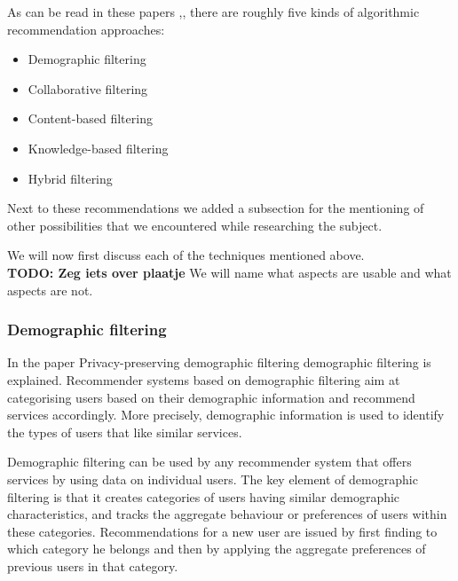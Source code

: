 \documentclass[]{article}
\newcommand{\TODO}[1]{{\color{red}\textbf{TODO: #1}}}
\begin{document}
As can be read in these papers \citep{Breese1998},\citep{Peter2007}, there are roughly five kinds of algorithmic recommendation approaches:

\begin{itemize}
\item Demographic filtering \citep{Peter2007}
\item Collaborative filtering \citep{Peter2007}\citep{Breese1998}
\item Content-based filtering \citep{Peter2007}
\item Knowledge-based filtering \citep{Peter2007}\cite{burke2000knowledge}
\item Hybrid filtering \citep{Peter2007}
\end{itemize}

Next to these recommendations we added a subsection for the mentioning of other possibilities that we encountered while researching the subject.

We will now first discuss each of the techniques mentioned above.\\
\TODO{Zeg iets over plaatje}
We will name what aspects are usable and what aspects are not.

\subsubsection{Demographic filtering}
In the paper Privacy-preserving demographic filtering\cite{aimeur2006privacy} demographic filtering is explained.
Recommender systems based on demographic filtering aim at categorising users based on their demographic information and recommend services accordingly. 
More precisely, demographic information is used to identify the types of users that like similar services. 

Demographic filtering can be used by any recommender system that offers services by using data on individual users. 
The key element of demographic filtering is that it creates categories of users having similar demographic characteristics, and tracks the aggregate behaviour or preferences of users within these categories. 
Recommendations for a new user are issued by first finding to which category he belongs and then by applying the aggregate preferences of previous users in that category.
\end{document}
